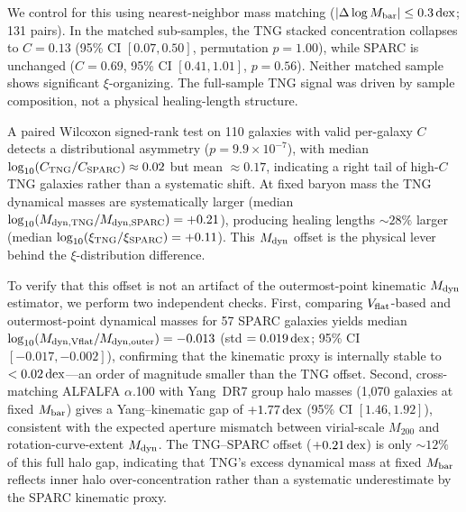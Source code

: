 \documentclass[twocolumn,twocolappendix]{aastex631}
\newcommand{\dex}{\,{\rm dex}}
\begin{document}
We control for this using nearest-neighbor mass matching
($|\Delta\log M_{\rm bar}| \leq 0.3\dex$; 131 pairs). In the matched
sub-samples, the TNG stacked concentration collapses to $C = 0.13$
(95\% CI $[0.07, 0.50]$, permutation $p = 1.00$), while SPARC is
unchanged ($C = 0.69$, 95\% CI $[0.41, 1.01]$, $p = 0.56$). Neither
matched sample shows significant $\xi$-organizing. The full-sample TNG
signal was driven by sample composition, not a physical healing-length
structure.

A paired Wilcoxon signed-rank test on 110 galaxies with valid per-galaxy
$C$ detects a distributional asymmetry ($p = 9.9 \times 10^{-7}$), with
median $\log_{10}(C_{\rm TNG}/C_{\rm SPARC}) \approx 0.02$ but
mean $\approx 0.17$, indicating a right tail of high-$C$ TNG galaxies
rather than a systematic shift. At fixed baryon mass the TNG dynamical
masses are systematically larger (median $\log_{10}(M_{\rm dyn,TNG}/
M_{\rm dyn,SPARC}) = +0.21$), producing healing lengths $\sim\!28\%$
larger (median $\log_{10}(\xi_{\rm TNG}/\xi_{\rm SPARC}) = +0.11$).
This $M_{\rm dyn}$ offset is the physical lever behind the
$\xi$-distribution difference.

To verify that this offset is not an artifact of the outermost-point
kinematic $M_{\rm dyn}$ estimator, we perform two independent checks.
First, comparing $V_{\rm flat}$-based and outermost-point dynamical
masses for 57 SPARC galaxies yields median
$\log_{10}(M_{\rm dyn,Vflat}/M_{\rm dyn,outer}) = -0.013$
(std $= 0.019\dex$; 95\% CI $[-0.017, -0.002]$), confirming that the
kinematic proxy is internally stable to $< 0.02\dex$---an order of
magnitude smaller than the TNG offset.
Second, cross-matching ALFALFA $\alpha$.100 with Yang~DR7 group halo
masses (1{,}070 galaxies at fixed $M_{\rm bar}$) gives a Yang--kinematic
gap of $+1.77\dex$ (95\% CI $[1.46, 1.92]$), consistent with the
expected aperture mismatch between virial-scale $M_{200}$ and
rotation-curve-extent $M_{\rm dyn}$. The TNG--SPARC offset ($+0.21\dex$)
is only $\sim\!12\%$ of this full halo gap, indicating that TNG's excess
dynamical mass at fixed $M_{\rm bar}$ reflects inner halo
over-concentration rather than a systematic underestimate by the SPARC
kinematic proxy.
\end{document}
